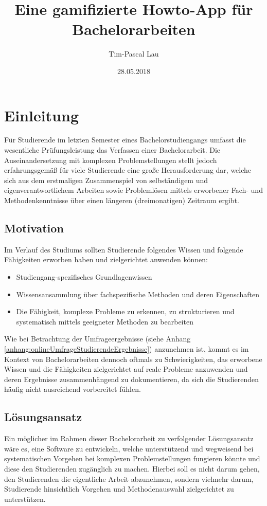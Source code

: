 \documentclass[bibliography=totoc,listof=totoc,BCOR=5mm,DIV=12,oneside]{scrbook}
\title{Eine gamifizierte Howto-App für Bachelorarbeiten}
\author{Tim-Pascal Lau}
\date{28.05.2018}
\begin{document}
\maketitle
\tableofcontents

\chapter{Einleitung}
Für Studierende im letzten Semester eines Bachelorstudiengangs umfasst die wesentliche Prüfungsleistung das Verfassen einer Bachelorarbeit.
Die Auseinandersetzung mit komplexen Problemstellungen stellt jedoch erfahrungsgemäß für viele Studierende eine große Herausforderung dar, welche sich aus dem erstmaligen Zusammenspiel von selbständigem und eigenverantwortlichem Arbeiten sowie Problemlösen mittels erworbener Fach- und Methodenkenntnisse über einen längeren (dreimonatigen) Zeitraum ergibt.

\section{Motivation}
Im Verlauf des Studiums sollten Studierende folgendes Wissen und folgende Fähigkeiten erworben haben und zielgerichtet anwenden können:
\begin{itemize}
\item Studiengang-spezifisches Grundlagenwissen
\item Wissensansammlung über fachspezifische Methoden und deren Eigenschaften
\item Die Fähigkeit, komplexe Probleme zu erkennen, zu strukturieren und systematisch mittels geeigneter Methoden zu bearbeiten
\end{itemize}
Wie bei Betrachtung der Umfrageergebnisse (siehe Anhang \ref{anhang:onlineUmfrageStudierendeErgebnisse}) anzunehmen ist, kommt es im Kontext von Bachelorarbeiten dennoch oftmals zu Schwierigkeiten, das erworbene Wissen und die Fähigkeiten zielgerichtet auf reale Probleme anzuwenden und deren Ergebnisse zusammenhängend zu dokumentieren, da sich die Studierenden häufig nicht ausreichend vorbereitet fühlen.

\section{Lösungsansatz}
Ein möglicher im Rahmen dieser Bachelorarbeit zu verfolgender Lösungsansatz wäre es, eine Software zu entwickeln, welche unterstützend und wegweisend bei systematischen Vorgehen bei komplexen Problemstellungen fungieren könnte und diese den Studierenden zugänglich zu machen.
Hierbei soll es nicht darum gehen, den Studierenden die eigentliche Arbeit abzunehmen, sondern vielmehr darum, Studierende hinsichtlich Vorgehen und Methodenauswahl zielgerichtet zu unterstützen.
\end{document}
